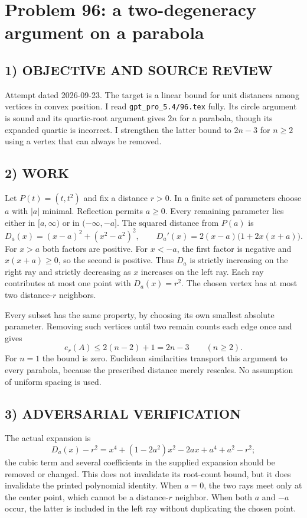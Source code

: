 \section{Problem 96: a two-degeneracy argument on a parabola}
\subsection*{1) OBJECTIVE AND SOURCE REVIEW}
Attempt dated 2026-09-23. The target is a linear bound for unit distances among vertices in convex position. I read \texttt{gpt\_pro\_5.4/96.tex} fully. Its circle argument is sound and its quartic-root argument gives $2n$ for a parabola, though its expanded quartic is incorrect. I strengthen the latter bound to $2n-3$ for $n\ge2$ using a vertex that can always be removed.
\subsection*{2) WORK}
Let $P(t)=(t,t^2)$ and fix a distance $r>0$. In a finite set of parameters choose $a$ with $|a|$ minimal. Reflection permits $a\ge0$. Every remaining parameter lies either in $[a,\infty)$ or in $(-\infty,-a]$. The squared distance from $P(a)$ is
\[
D_a(x)=(x-a)^2+(x^2-a^2)^2,
\qquad D_a'(x)=2(x-a)\bigl(1+2x(x+a)\bigr).
\]
For $x>a$ both factors are positive. For $x<-a$, the first factor is negative and $x(x+a)\ge0$, so the second is positive. Thus $D_a$ is strictly increasing on the right ray and strictly decreasing as $x$ increases on the left ray. Each ray contributes at most one point with $D_a(x)=r^2$. The chosen vertex has at most two distance-$r$ neighbors.

Every subset has the same property, by choosing its own smallest absolute parameter. Removing such vertices until two remain counts each edge once and gives
\[
e_r(A)\le2(n-2)+1=2n-3\qquad(n\ge2).
\]
For $n=1$ the bound is zero. Euclidean similarities transport this argument to every parabola, because the prescribed distance merely rescales. No assumption of uniform spacing is used.
\subsection*{3) ADVERSARIAL VERIFICATION}
The actual expansion is
\[
D_a(x)-r^2=x^4+(1-2a^2)x^2-2ax+a^4+a^2-r^2;
\]
the cubic term and several coefficients in the supplied expansion should be removed or changed. This does not invalidate its root-count bound, but it does invalidate the printed polynomial identity. When $a=0$, the two rays meet only at the center point, which cannot be a distance-$r$ neighbor. When both $a$ and $-a$ occur, the latter is included in the left ray without duplicating the chosen point.
